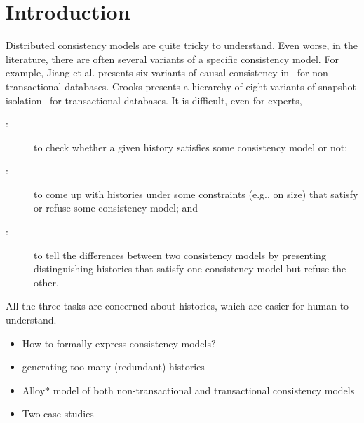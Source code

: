 
\section{Introduction} \label{section:intro}

Distributed consistency models are quite tricky to understand.
Even worse, in the literature, there are often several variants of a specific consistency model.
For example, Jiang et al. presents six variants of causal consistency in~\cite{SpecFramework:SRDS2020} for non-transactional databases.
Crooks presents a hierarchy of eight variants of snapshot isolation~\cite{Crooks:PODC2017} for transactional databases.
It is difficult, even for experts,
\begin{description}
  \item[\taskchecking:] to check whether a given history satisfies some consistency model or not;
  \item[\taskgenerating:] to come up with histories under some constraints (e.g., on size)
    that satisfy or refuse some consistency model; and
  \item[\taskcomparing:] to tell the differences between two consistency models
    by presenting distinguishing histories that satisfy one consistency model but refuse the other.
\end{description}
All the three tasks are concerned about histories, which are easier for human to understand.


\begin{itemize}
  \item How to formally express consistency models?
  \item generating too many (redundant) histories
\end{itemize}

\begin{itemize}
  \item Alloy$\ast$ model of both non-transactional and transactional consistency models
  \item Two case studies
\end{itemize}
